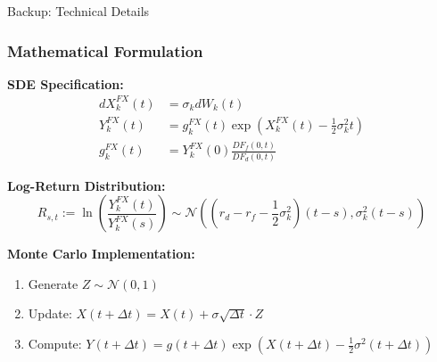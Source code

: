 \documentclass[11pt,aspectratio=169]{beamer}
\begin{document}
	
	

	\appendix
	
	\begin{frame}[allowframebreaks]{Backup: Technical Details}
		\frametitle{Mathematical Formulation}
		
		\textbf{SDE Specification:}
		\begin{align*}
			dX_k^{FX}(t) &= \sigma_k dW_k(t) \\
			Y_k^{FX}(t) &= g_k^{FX}(t) \exp\left(X_k^{FX}(t) - \frac{1}{2}\sigma_k^2 t\right) \\
			g_k^{FX}(t) &= Y_k^{FX}(0) \frac{DF_f(0,t)}{DF_d(0,t)}
		\end{align*}
		
		\framebreak
		
		\textbf{Log-Return Distribution:}
		\begin{equation*}
			R_{s,t} := \ln\left(\frac{Y_k^{FX}(t)}{Y_k^{FX}(s)}\right) \sim \mathcal{N}\left((r_d - r_f - \frac{1}{2}\sigma_k^2)(t-s), \sigma_k^2(t-s)\right)
		\end{equation*}
		
		\framebreak
		
		\textbf{Monte Carlo Implementation:}
		\begin{enumerate}
			\item Generate $Z \sim \mathcal{N}(0,1)$
			\item Update: $X(t+\Delta t) = X(t) + \sigma\sqrt{\Delta t} \cdot Z$
			\item Compute: $Y(t+\Delta t) = g(t+\Delta t) \exp(X(t+\Delta t) - \frac{1}{2}\sigma^2(t+\Delta t))$
		\end{enumerate}
	\end{frame}
	
\end{document}
